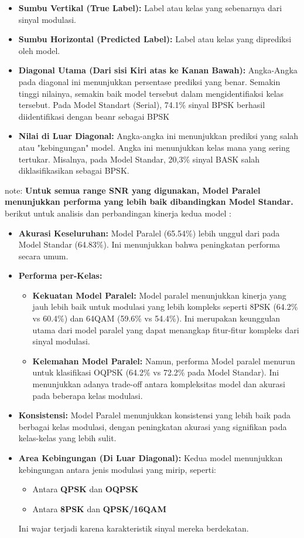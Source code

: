 \documentclass{article}
\begin{document}
\begin{itemize}
    \item \textbf{Sumbu Vertikal (True Label):} Label atau kelas yang sebenarnya dari sinyal modulasi. 
    \item \textbf{Sumbu Horizontal (Predicted Label):} Label atau kelas yang diprediksi oleh model.
    \item \textbf{Diagonal Utama (Dari sisi Kiri atas ke Kanan Bawah):} Angka-Angka pada diagonal ini menunjukkan persentase prediksi yang benar. Semakin tinggi nilainya,
    semakin baik model tersebut dalam mengidentifiaksi kelas tersebut. Pada Model Standart (Serial), 74.1\% sinyal BPSK berhasil diidentifikasi dengan beanr sebagai BPSK
    \item \textbf{Nilai di Luar Diagonal:} Angka-angka ini menunjukkan prediksi yang salah atau "kebingungan" model. Angka ini menunjukkan kelas mana yang sering tertukar. Misalnya, pada Model Standar, 20,3\% sinyal BASK salah diklasifikasikan sebagai BPSK.
\end{itemize} 
note: \textbf{Untuk semua range SNR yang digunakan, Model Paralel menunjukkan performa yang lebih baik dibandingkan Model Standar.} 
berikut untuk analisis dan perbandingan kinerja kedua model :
\begin{itemize}
    \item \textbf{Akurasi Keseluruhan:} Model Paralel (65.54\%) lebih unggul dari pada Model Standar (64.83\%). Ini menunjukkan bahwa peningkatan performa secara umum.
    
    \item \textbf{Performa per-Kelas:}
    \begin{itemize}
        \item \textbf{Kekuatan Model Paralel:} Model paralel menunjukkan kinerja yang jauh lebih baik untuk modulasi yang lebih kompleks seperti 8PSK (64.2\% vs 60.4\%) dan 64QAM (59.6\% vs 54.4\%). Ini merupakan keunggulan utama dari model paralel yang dapat menangkap fitur-fitur kompleks dari sinyal modulasi.
        \item \textbf{Kelemahan Model Paralel:} Namun, performa Model paralel menurun untuk klasifikasi OQPSK (64.2\% vs 72.2\% pada Model Standar). Ini menunjukkan adanya trade-off antara kompleksitas model dan akurasi pada beberapa kelas modulasi.
    \end{itemize}
    
    \item \textbf{Konsistensi:} Model Paralel menunjukkan konsistensi yang lebih baik pada berbagai kelas modulasi, dengan peningkatan akurasi yang signifikan pada kelas-kelas yang lebih sulit.
    
    \item \textbf{Area Kebingungan (Di Luar Diagonal):} Kedua model menunjukkan kebingungan antara jenis modulasi yang mirip, seperti:
    \begin{itemize}
        \item Antara \textbf{QPSK} dan \textbf{OQPSK}
        \item Antara \textbf{8PSK} dan \textbf{QPSK/16QAM}
    \end{itemize}
    Ini wajar terjadi karena karakteristik sinyal mereka berdekatan.
\end{itemize}
\end{document}
